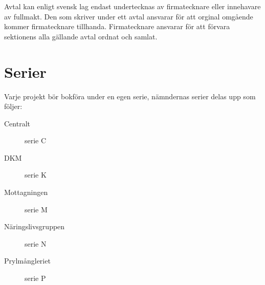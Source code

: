 \documentclass{dgovdoc}
\begin{document}
Avtal kan enligt svensk lag endast undertecknas av firmatecknare eller innehavare av fullmakt. Den som
skriver under ett avtal ansvarar för att orginal omgående kommer firmatecknare tillhanda. Firmatecknare
ansvarar för att förvara sektionens alla gällande avtal ordnat och samlat.

\appendix

\section{Serier}
\label{sec:serier}
Varje projekt bör bokföra under en egen serie, nämndernas serier delas upp som följer:
\begin{description}
\item[Centralt] serie C
\item[DKM] serie K
\item[Mottagningen] serie M
\item[Näringslivsgruppen] serie N
\item[Prylmångleriet] serie P
\end{description}
\end{document}

